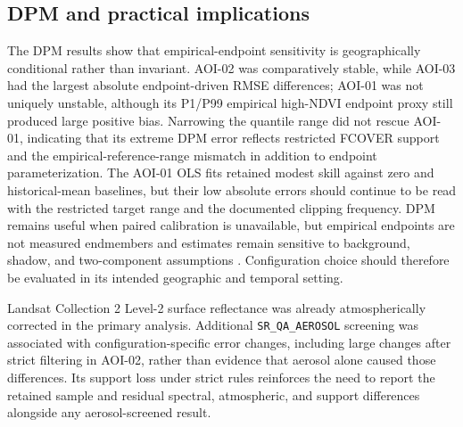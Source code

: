 \subsection{DPM and practical implications}
The DPM results show that empirical-endpoint sensitivity is geographically conditional rather than invariant. AOI-02 was comparatively stable, while AOI-03 had the largest absolute endpoint-driven RMSE differences; AOI-01 was not uniquely unstable, although its P1/P99 empirical high-NDVI endpoint proxy still produced large positive bias. Narrowing the quantile range did not rescue AOI-01, indicating that its extreme DPM error reflects restricted FCOVER support and the empirical-reference-range mismatch in addition to endpoint parameterization. The AOI-01 OLS fits retained modest skill against zero and historical-mean baselines, but their low absolute errors should continue to be read with the restricted target range and the documented clipping frequency. DPM remains useful when paired calibration is unavailable, but empirical endpoints are not measured endmembers and estimates remain sensitive to background, shadow, and two-component assumptions \citep{huete1988,montandon2008,jiapaer2011,yan2022dpm,mu2024}. Configuration choice should therefore be evaluated in its intended geographic and temporal setting.

Landsat Collection 2 Level-2 surface reflectance was already atmospherically corrected in the primary analysis. Additional \texttt{SR\_QA\_AEROSOL} screening was associated with configuration-specific error changes, including large changes after strict filtering in AOI-02, rather than evidence that aerosol alone caused those differences. Its support loss under strict rules reinforces the need to report the retained sample and residual spectral, atmospheric, and support differences alongside any aerosol-screened result.

